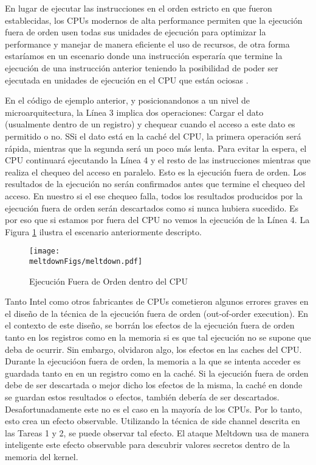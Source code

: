 En lugar de ejecutar las instrucciones en el orden estricto en que fueron establecidas, los CPUs modernos de alta performance permiten que la ejecución fuera de orden usen todas sus unidades de ejecución para optimizar la performance y manejar de manera eficiente el uso de recursos, de otra forma estaríamos en un escenario donde una instrucción esperaría que termine la ejecución de una instrucción anterior teniendo la posibilidad de poder ser ejecutada en unidades de ejecución en el CPU que están ociosas \cite{wiki:outoforder}. 

En el código de ejemplo anterior, y posicionandonos a un nivel de microarquitectura, la Línea 3 implica dos operaciones: Cargar el dato (usualmente dentro de un registro) y chequear cuando el acceso a este dato es permitido o no. SSi el dato está en la caché del CPU, la primera operación será rápida, mientras que la segunda será un poco más lenta. Para evitar la espera, el CPU continuará ejecutando la Línea 4 y el resto de las instrucciones mientras que realiza el chequeo del acceso en paralelo. Esto es la ejecución fuera de orden. Los resultados de la ejecución no serán confirmados antes que termine el chequeo del acceso. En nuestro si el ese chequeo falla, todos los resultados producidos por la ejecución fuera de orden serán descartados como si nunca hubiera sucedido. Es por eso que si estamos por fuera del CPU no vemos la ejecución de la Línea 4.
La Figura \ref{meltdown:fig:outoforder} ilustra el escenario anteriormente descripto.



\begin{figure}[htb]
\centering
\texttt{[image: \\meltdownFigs/meltdown.pdf]}
\caption{Ejecución Fuera de Orden dentro del CPU}
\label{meltdown:fig:outoforder}
\end{figure}

Tanto Intel como otros fabricantes de CPUs cometieron algunos errores graves en el diseño de la técnica de la ejecución fuera de orden (out-of-order execution).
En el contexto de este diseño, se borrán los efectos de la ejecución fuera de orden tanto en los registros como en la memoria si es que tal ejecución no se supone que deba de ocurrir. Sin embargo, olvidaron algo, los efectos en las caches del CPU.
Durante la ejecucióon fuera de orden, la memoria a la que se intenta acceder es guardada tanto en en un registro como en la caché. Si la ejecución fuera de orden debe de ser descartada o mejor dicho los efectos de la misma, la caché en donde se guardan estos resultados o efectos, también debería de ser descartados. Desafortunadamente este no es el caso en la mayoría de los CPUs.
Por lo tanto, esto crea un efecto observable.
Utilizando la técnica de side channel descrita en las Tareas 1 y 2,
se puede observar tal efecto. El ataque Meltdown usa de manera inteligente este
efecto observable para descubrir valores secretos dentro de la memoria del kernel.

